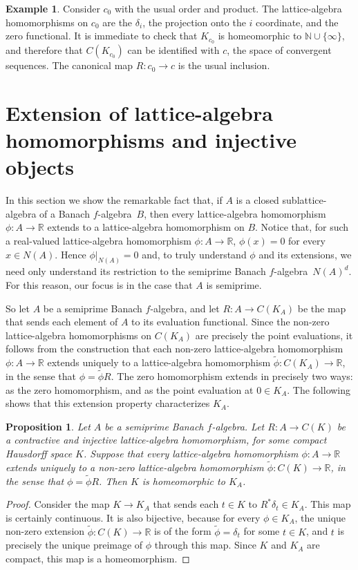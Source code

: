 \documentclass{memo-l}
\newtheorem{prop}[theorem]{Proposition}
\theoremstyle{definition}
\newtheorem{example}[theorem]{Example}
\theoremstyle{remark}
\numberwithin{section}{chapter}
\numberwithin{equation}{chapter}
\newcommand\N{\ensuremath{\mathbb{N}}}
\newcommand\R{\ensuremath{\mathbb{R}}}
\newcommand{\falg}{$f\!$-algebra}
\begin{document}
\begin{example}
    Consider $c_0$ with the usual order and product. The
    lattice-algebra homomorphisms on $c_0$ are the $\delta _i$, the
    projection onto the $i$ coordinate, and the zero functional.
    It is immediate to check that $K_{c_0}$ is homeomorphic to $\N\cup
    \{\infty \}$, and therefore that $C(K_{c_0})$ can be identified
    with $c$, the space of convergent sequences. The canonical map
    $R\colon c_0\to c$ is the usual inclusion.
\end{example}

\section[Extensions and injective objects]{Extension of lattice-algebra homomorphisms and injective objects}

In this section we show the remarkable fact that, if $A$ is a closed
sublattice-algebra of a Banach \falg\ $B$, then every
lattice-algebra homomorphism $\phi \colon A\to \R$ extends to a
lattice-algebra homomorphism on $B$. Notice that, for such a
real-valued lattice-algebra homomorphism $\phi \colon A\to \R$, $\phi
(x)=0$ for every $x \in N(A)$. Hence $\phi |_{N(A)}=0$ and, to truly
understand $\phi $ and its extensions, we need only understand its
restriction to the semiprime Banach \falg\ $N(A)^{d}$. For this
reason, our focus is in the case that $A$ is semiprime.

So let $A$ be a semiprime Banach \falg, and let $R\colon A\to C(K_A)$
be the map that sends each element of $A$ to its evaluation functional.
Since the non-zero lattice-algebra homomorphisms on $C(K_A)$ are precisely the
point evaluations, it follows from the construction that each
non-zero lattice-algebra homomorphism $\phi \colon A\to \R$ extends uniquely to
a lattice-algebra homomorphism $\tilde \phi \colon C(K_A)\to \R$, in
the sense that $\phi =\tilde \phi R$. The zero homomorphism extends in precisely two ways: as the zero homomorphism, and as the point evaluation at $0\in K_A$. The following shows that this extension property characterizes $K_A$.

\begin{prop}\label{prop:char_KA1}
    Let $A$ be a semiprime Banach \falg. Let $R\colon A\to C(K)$ be a
    contractive and injective lattice-algebra homomorphism, for some
    compact Hausdorff space $K$. Suppose that every lattice-algebra
    homomorphism $\phi \colon A\to \R$ extends uniquely to a non-zero
    lattice-algebra homomorphism $\tilde \phi \colon C(K)\to \R$, in
    the sense that $\phi =\tilde \phi R$. Then $K$ is homeomorphic to
    $K_A$.
\end{prop}
\begin{proof}
    Consider the map $K\to K_A$ that sends each $t \in K$ to
    $R^{*}\delta _t \in K_A$. This map is certainly continuous. It is
    also bijective, because for every $\phi \in K_A$, the unique
    non-zero extension $\tilde\phi \colon C(K)\to \R$ is of the form
    $\tilde \phi =\delta _t$ for some $t \in K$, and $t$ is precisely
    the unique preimage of $\phi $ through this map. Since $K$ and
    $K_A$ are compact, this map is a homeomorphism.
\end{proof}
\end{document}
